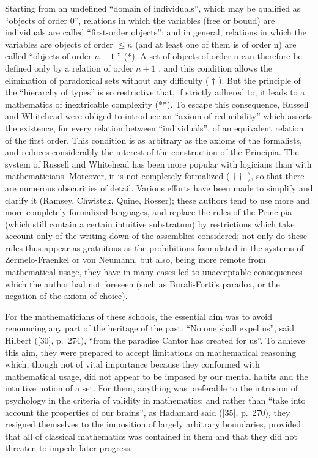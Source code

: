 Starting from an undefined ``domain of individuals'', which may be qualified as ``objects of order 0'', relations in which the variables (free or bouud) are individuals are called ``first-order objects''; and in general, relations in which the variables are objects of order \(\leqslant n\) (and at least one of them is of order n) are called ``objects of order \(n + 1\) '' (*). A set of objects of order n can therefore be defined only by a relation of order \(n + 1\) , and this condition allows the elimination of paradoxical sets without any difficulty ( \(\dagger\) ). But the principle of the ``hierarchy of types'' is so restrictive that, if strictly adhered to, it leads to a mathematics of inextricable complexity (**). To escape this consequence, Russell and Whitehead were obliged to introduce an ``axiom of reducibility'' which asserts the existence, for every relation between ``individuals'', of an equivalent relation of the first order. This condition is as arbitrary as the axioms of the formalists, and reduces considerably the interest of the construction of the Principia. The system of Russell and Whitehead has been more popular with logicians than with mathematicians. Moreover, it is not completely formalized ( \(\dagger\dagger\) ), so that there are numerous obscurities of detail. Various efforts have been made to simplify and clarify it (Ramsey, Chwistek, Quine, Rosser); these authors tend to use more and more completely formalized languages, and replace the rules of the Principia (which still contain a certain intuitive substratum) by restrictions which take account only of the writing down of the assemblies considered; not only do these rules thus appear as gratuitous as the prohibitions formulated in the systems of Zermelo-Fraenkel or von Neumann, but also, being more remote from mathematical usage, they have in many cases led to unacceptable consequences which the author had not foreseen (such as Burali-Forti's paradox, or the negation of the axiom of choice).

For the mathematicians of these schools, the essential aim was to avoid renouncing any part of the heritage of the past. ``No one shall expel us'', said Hilbert ({[}30{]}, p.~274), ``from the paradise Cantor has created for us''. To achieve this aim, they were prepared to accept limitations on mathematical reasoning which, though not of vital importance because they conformed with mathematical usage, did not appear to be imposed by our mental habits and the intuitive notion of a set. For them, anything was preferable to the intrusion of psychology in the criteria of validity in mathematics; and rather than ``take into account the properties of our brains'', as Hadamard said ({[}35{]}, p.~270), they resigned themselves to the imposition of largely arbitrary boundaries, provided that all of classical mathematics was contained in them and that they did not threaten to impede later progress.

